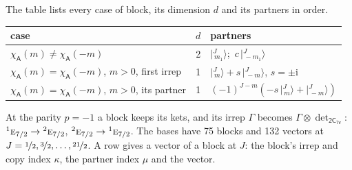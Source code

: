 \documentclass[10pt,a4paper]{article}
\numberwithin{equation}{section}
\newcommand{\grp}[1]{\mathsf{#1}}
\newcommand{\irr}[1]{\text{\normalfont\scshape #1}}
\newcommand{\conjpair}[1]{{}^{#1}}
\newcommand{\iunit}{\mathrm{i}}
\newcommand{\chiA}{\chi_{\grp{A}}}
\newcommand{\irrprod}{\otimes}
\newcommand{\mult}{\kappa}
\newcommand{\intx}{\mu}
\newcommand{\jm}[2]{\bigl\lvert{}^{#1}_{\,#2}\bigr\rangle}
\begin{document}
\leavevmode\label{n:head.case}\label{n:head.partners}The table lists every case of block, its dimension $d$ and its partners in order.
\begin{center}\begin{tabular}{@{}lrl@{}}\toprule
case & $d$ & partners\\\midrule
$\chiA(m) \ne \chiA(-m)$ & 2 & $\jm{J}{m_1}$;\ $c\,\jm{J}{-m_1}$\\
$\chiA(m) = \chiA(-m)$, $m > 0$, first irrep & 1 & $\jm{J}{m} + s\,\jm{J}{-m}$, $s = \pm\iunit$\\
$\chiA(m) = \chiA(-m)$, $m > 0$, its partner & 1 & $(-1)^{J-m}(-s\,\jm{J}{m} + \jm{J}{-m})$\\
\bottomrule\end{tabular}\end{center}
\leavevmode\label{n:operator.determinant.character}At the parity $p = -1$ a block keeps its kets, and its irrep $\Gamma$ becomes $\Gamma \irrprod \det_{\grp{2C_{7v}}}$: $\conjpair{1}\irr{e}_{7/2} \to \conjpair{2}\irr{e}_{7/2}$, $\conjpair{2}\irr{e}_{7/2} \to \conjpair{1}\irr{e}_{7/2}$.
The bases have 75 blocks and 132 vectors at $J = \nicefrac{1}{2}, \nicefrac{3}{2}, \dots, \nicefrac{21}{2}$. \label{n:head.vector}A row gives a vector of a block at $J$: the block's irrep and copy index $\mult$, the partner index $\intx$ and the vector.
\end{document}
